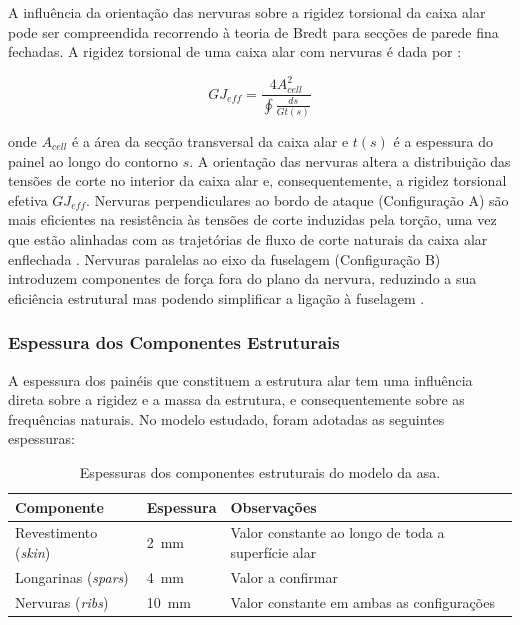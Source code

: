 \documentclass[a4paper,fleqn]{cas-sc}
\begin{document}
A influência da orientação das nervuras sobre a rigidez torsional da caixa alar pode ser compreendida recorrendo à teoria de Bredt para secções de parede fina fechadas. A rigidez torsional de uma caixa alar com nervuras é dada por \cite{Megson2012}:

\begin{equation}
    GJ_{eff} = \frac{4A_{cell}^2}{\oint \frac{ds}{Gt(s)}}
    \label{eq:bredt}
\end{equation}

\noindent onde $A_{cell}$ é a área da secção transversal da caixa alar e $t(s)$ é a espessura do painel ao longo do contorno $s$. A orientação das nervuras altera a distribuição das tensões de corte no interior da caixa alar e, consequentemente, a rigidez torsional efetiva $GJ_{eff}$. Nervuras perpendiculares ao bordo de ataque (Configuração A) são mais eficientes na resistência às tensões de corte induzidas pela torção, uma vez que estão alinhadas com as trajetórias de fluxo de corte naturais da caixa alar enflechada \cite{Niu1988, Megson2012}. Nervuras paralelas ao eixo da fuselagem (Configuração B) introduzem componentes de força fora do plano da nervura, reduzindo a sua eficiência estrutural mas podendo simplificar a ligação à fuselagem \cite{Raymer2018}.

\subsubsection{Espessura dos Componentes Estruturais}

A espessura dos painéis que constituem a estrutura alar tem uma influência direta sobre a rigidez e a massa da estrutura, e consequentemente sobre as frequências naturais. No modelo estudado, foram adotadas as seguintes espessuras:

\begin{table}
\centering
\caption{Espessuras dos componentes estruturais do modelo da asa.}
\label{tab:espessuras}
\renewcommand{\arraystretch}{1.4}
\begin{tabularx}{\textwidth}{p{4cm} p{3cm} X}
\toprule
\textbf{Componente} & \textbf{Espessura} & \textbf{Observações} \\
\midrule
Revestimento (\textit{skin})    & \SI{2}{\milli\meter}  & 
    Valor constante ao longo de toda a superfície alar \\
Longarinas (\textit{spars})     & \SI{4}{\milli\meter}  & 
    Valor a confirmar\footnotemark \\
Nervuras (\textit{ribs})        & \SI{10}{\milli\meter} & 
    Valor constante em ambas as configurações \\
\bottomrule
\end{tabularx}
\end{table}
\end{document}
